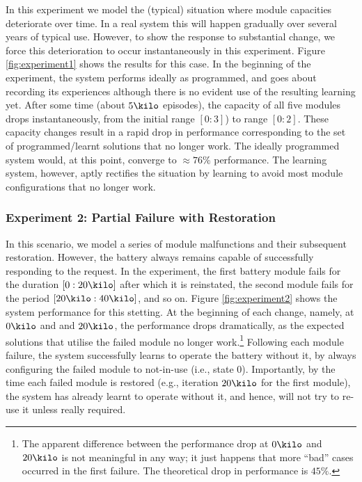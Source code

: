 In this experiment we model the (typical) situation where module capacities deteriorate over time. In a real system this will happen gradually over several years of typical use. However, to show the response to substantial change, we force this deterioration to occur instantaneously in this experiment. 
Figure \ref{fig:experiment1} shows the results for this case. In the beginning of the experiment, the system performs ideally as programmed, and goes about recording its experiences although there is no evident use of the resulting learning yet. After some time (about $5\kilo$ episodes), the capacity of all five modules drops instantaneously, from the initial range $[0:3]$) to range $[0:2]$. 
These capacity changes result in a rapid drop in performance corresponding to the set of programmed/learnt solutions that no longer work. The ideally programmed system would, at this point, converge to $\approx 76\%$ performance. The learning system, however, aptly rectifies the situation by learning to avoid most module configurations that no longer work. 


%


\subsubsection{Experiment 2: Partial Failure with Restoration}

In this scenario, we model a series of module malfunctions and their subsequent restoration. However, the battery always remains capable of successfully responding to the request.
In the experiment, the first battery module fails for the duration $[0:20\kilo]$ after which it is reinstated, the second module fails for the period $[20\kilo:40\kilo]$, and so on. 
Figure \ref{fig:experiment2} shows the system performance for this stetting. At the beginning of each change, namely, at $0\kilo$ and and $20\kilo$, the performance drops dramatically, as the expected solutions that utilise the failed module no longer work.\footnote{The apparent difference between the  performance drop at $0\kilo$ and $20\kilo$ is not meaningful in any way; it just happens that more ``bad'' cases occurred in the  first failure. The theoretical drop in performance is $45\%$.} 
Following each module failure, the system successfully learns to operate the battery without it, by always configuring the failed module to not-in-use (i.e., state $0$). Importantly, by the time each failed module is restored (e.g., iteration $20\kilo$ for the first module), the system has already learnt to operate without it, and hence, will not try to re-use it unless really required.


